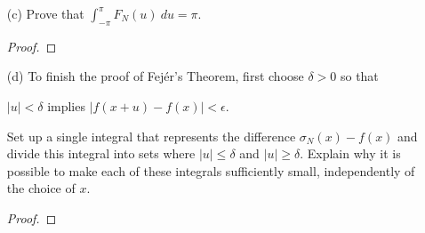 \begin{enumerate}
\begin{proof}[Solution]
        \end{proof}
    \item[(c)] Prove that \( \int_{ -\pi  }^{ \pi  } F_{N}(u)  \ du = \pi. \)
        \begin{proof}
        
        \end{proof}
    \item[(d)] To finish the proof of Fej\'{e}r's  Theorem, first choose \( \delta > 0  \) so that 
        \begin{center}
            \( | u  |  < \delta  \) implies \( |  f(x+u) - f(x)  | < \epsilon. \)
        \end{center}
        Set up a single integral that represents the difference \( \sigma_{N}(x) - f(x)  \) and divide this integral into sets where \( | u  |  \leq \delta  \) and \( |  u  |  \geq \delta  \). Explain why it is possible to make each of these integrals sufficiently small, independently of the choice of \( x  \).
        \begin{proof}
        
        \end{proof}
\end{enumerate}





